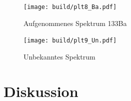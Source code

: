 \begin{figure}
    \centering
    \texttt{[image: build/plt8\_Ba.pdf]}
	\caption{Aufgenommenes Spektrum 133Ba}\label{fig:Ba_spektrum}
\end{figure}

\begin{figure}
    \centering
    \texttt{[image: build/plt9\_Un.pdf]}
	\caption{Unbekanntes Spektrum}\label{fig:Un_spektrum}
\end{figure}




\section{Diskussion}

\newpage
\printbibliography

